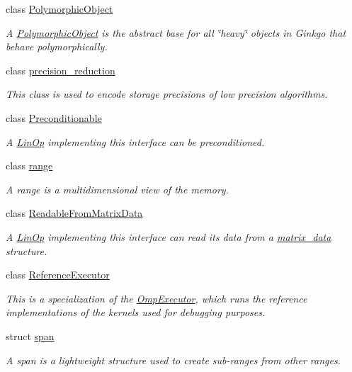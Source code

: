 \begin{DoxyCompactItemize}
class \hyperlink{classgko_1_1PolymorphicObject}{Polymorphic\+Object}
\begin{DoxyCompactList}\small\item\em A \hyperlink{classgko_1_1PolymorphicObject}{Polymorphic\+Object} is the abstract base for all \char`\"{}heavy\char`\"{} objects in Ginkgo that behave polymorphically. \end{DoxyCompactList}\item 
class \hyperlink{classgko_1_1precision__reduction}{precision\+\_\+reduction}
\begin{DoxyCompactList}\small\item\em This class is used to encode storage precisions of low precision algorithms. \end{DoxyCompactList}\item 
class \hyperlink{classgko_1_1Preconditionable}{Preconditionable}
\begin{DoxyCompactList}\small\item\em A \hyperlink{classgko_1_1LinOp}{Lin\+Op} implementing this interface can be preconditioned. \end{DoxyCompactList}\item 
class \hyperlink{classgko_1_1range}{range}
\begin{DoxyCompactList}\small\item\em A range is a multidimensional view of the memory. \end{DoxyCompactList}\item 
class \hyperlink{classgko_1_1ReadableFromMatrixData}{Readable\+From\+Matrix\+Data}
\begin{DoxyCompactList}\small\item\em A \hyperlink{classgko_1_1LinOp}{Lin\+Op} implementing this interface can read its data from a \hyperlink{structgko_1_1matrix__data}{matrix\+\_\+data} structure. \end{DoxyCompactList}\item 
class \hyperlink{classgko_1_1ReferenceExecutor}{Reference\+Executor}
\begin{DoxyCompactList}\small\item\em This is a specialization of the \hyperlink{classgko_1_1OmpExecutor}{Omp\+Executor}, which runs the reference implementations of the kernels used for debugging purposes. \end{DoxyCompactList}\item 
struct \hyperlink{structgko_1_1span}{span}
\begin{DoxyCompactList}\small\item\em A span is a lightweight structure used to create sub-\/ranges from other ranges. \end{DoxyCompactList}\item 

\end{DoxyCompactItemize}
